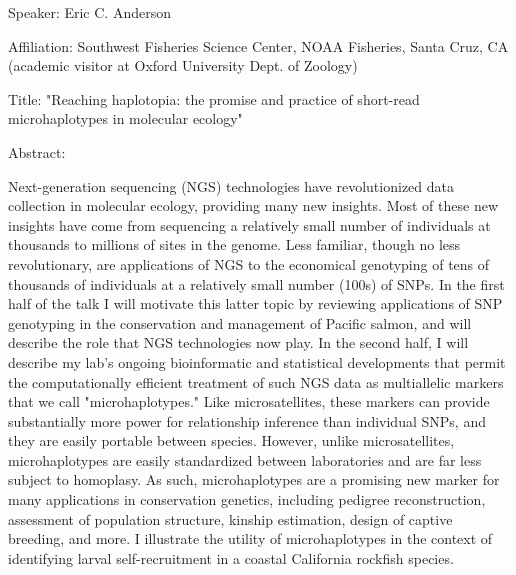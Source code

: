 Speaker: Eric C. Anderson

Affiliation: Southwest Fisheries Science Center, NOAA Fisheries, Santa Cruz, CA (academic visitor at Oxford University Dept. of Zoology)

Title:  "Reaching haplotopia: the promise and practice of short-read microhaplotypes in molecular ecology"

Abstract: 

Next-generation sequencing (NGS) technologies have revolutionized data collection in molecular ecology, providing many new insights.  Most of these new insights have come from sequencing a relatively small number of individuals at thousands to millions of sites in the genome. Less familiar, though no less revolutionary, are applications of NGS to the economical genotyping of tens of thousands of individuals at a relatively small number (100s) of SNPs.  In the first half of the talk I will motivate this latter topic by reviewing applications of SNP genotyping in the conservation and management of Pacific salmon, and will describe the role that NGS technologies now play.  In the second half, I will describe my lab's ongoing bioinformatic and statistical developments that permit the computationally efficient treatment of such NGS data as multiallelic markers that we call "microhaplotypes."  Like microsatellites, these markers can provide substantially more power for relationship inference than individual SNPs, and they are easily portable between species.  However, unlike microsatellites, microhaplotypes are easily standardized between laboratories and are far less subject to homoplasy.  As such, microhaplotypes are a promising new marker for many applications in conservation genetics, including pedigree reconstruction, assessment of population structure, kinship estimation, design of captive breeding, and more.  I illustrate the utility of microhaplotypes in the context of identifying larval self-recruitment in a coastal California rockfish species.   


